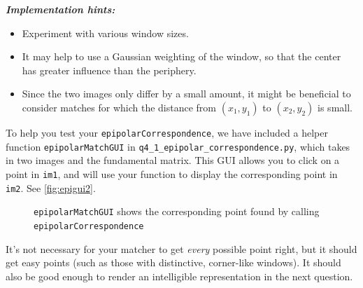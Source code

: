 \textbf{\emph{Implementation hints:}}
\begin{itemize}
    \item Experiment with various window sizes.
    \item It may help to use a Gaussian weighting of the window, so that the center has greater influence than the periphery.
    \item Since the two images only differ by a small amount, it might be beneficial to consider matches for which the distance from $(x_1, y_1)$ to $(x_2, y_2)$ is small.
\end{itemize}
To help you test your \texttt{epipolarCorrespondence}, we have included a helper function \texttt{epipolarMatchGUI} in \texttt{q4\_1\_epipolar\_correspondence.py}, which takes in two images and the fundamental matrix. This GUI allows you to click on a point in \texttt{im1}, and will use your function to display the corresponding point in \texttt{im2}. See \autoref{fig:epigui2}.
\begin{figure}[h]
    \centering
    \caption{\texttt{epipolarMatchGUI} shows the corresponding point found by
    calling \texttt{epipolarCorrespondence}}
    \label{fig:epigui2}
\end{figure}

It's not necessary for your matcher to get \textit{every} possible point right, but it should get easy points (such as those with distinctive, corner-like windows). It should also be good enough to render an intelligible representation in the next question.


